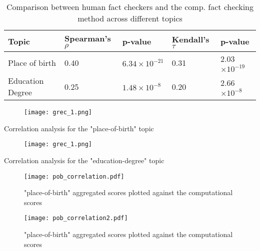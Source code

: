 \documentclass[10pt,11pt,12pt,oneside]{book}
\begin{document}
\newpage
\begin{table}[H]
	\begin{tabular}{ | p{5.1cm} || p{2.5cm} | p{2.1cm} || p{2.1cm} | p{2.1cm} |}
		\hline
		Topic & Spearman's $ \rho $  & p-value  &  Kendall's $\tau $  & p-value \\
		\hline
		Place of birth & 0.40 & $ 6.34\times 10^{-21} $ & 0.31 & 2.03$\times 10^{-19} $\\
		\hline
		Education Degree & 0.25 & $ 1.48\times 10^{-8} $ & 0.20 & 2.66$\times 10^{-8} $\\
		\hline
	\end{tabular}
	\caption{Comparison between human fact checkers and the comp. fact checking method across different topics}
	\label{table_phase3_pob}
\end{table}

\begin{table}[H]
	\begin{figure}[H]
		\begin{center}
			\texttt{[image: grec\_1.png]}\\
		\end{center}
	\end{figure}
	\label{table_phase3_topic1}
	\caption{Correlation analysis for the "place-of-birth" topic}
\end{table}

\begin{table}[H]
	\begin{figure}[H]
		\begin{center}
			\texttt{[image: grec\_1.png]}\\
		\end{center}
	\end{figure}
	\label{table_phase3_topic2}
	\caption{Correlation analysis for the "education-degree" topic}
\end{table}


\begin{figure}[H]
	\begin{center}
		\texttt{[image: pob\_correlation.pdf]}\\
		\caption{"place-of-birth" aggregated scores plotted against the computational scores}
		\label{pob_correlation_scatter}
	\end{center}
\end{figure}

\begin{figure}[H]
	\begin{center}
		\texttt{[image: pob\_correlation2.pdf]}\\
		\caption{"place-of-birth" aggregated scores plotted against the computational scores}
		\label{pob_correlation2}
	\end{center}
\end{figure}
\end{document}
